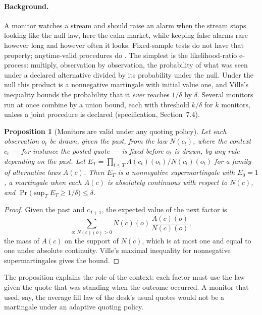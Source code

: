 \documentclass[11pt]{article}
\newcommand{\spec}[1]{specification, Section~#1}
\theoremstyle{definition}
\theoremstyle{plain}
\newtheorem{proposition}[definition]{Proposition}
\begin{document}
\paragraph{Background.} A monitor watches a stream and should raise an alarm when the stream stops
looking like the null law, here the calm market, while keeping false alarms rare however long and
however often it looks. Fixed-sample tests do not have that property; anytime-valid procedures do
\cite{ramdas,howardcs}. The simplest is the likelihood-ratio e-process: multiply, observation by
observation, the probability of what was seen under a declared alternative divided by its probability
under the null. Under the null this product is a nonnegative martingale with initial value one, and
Ville's inequality \cite{ville} bounds the probability that it \emph{ever} reaches $1/\delta$ by
$\delta$. Several monitors run at once combine by a union bound, each with threshold $k/\delta$ for $k$
monitors, unless a joint procedure is declared (\spec{7.4}).

\begin{proposition}[Monitors are valid under any quoting policy]\label{prop:monitor}
Let each observation $o_t$ be drawn, given the past, from the law $N(c_t)$, where the context $c_t$ ---
for instance the posted quote --- is fixed before $o_t$ is drawn, by any rule depending on the past. Let
$E_T=\prod_{t\le T}A(c_t)(o_t)/N(c_t)(o_t)$ for a family of alternative laws $A(c)$. Then $E_T$ is a
nonnegative supermartingale with $E_0=1$, a martingale when each $A(c)$ is absolutely continuous with
respect to $N(c)$, and $\Pr\bigl(\sup_TE_T\ge1/\delta\bigr)\le\delta$.
\end{proposition}

\begin{proof}
Given the past and $c_{T+1}$, the expected value of the next factor is
\[
\sum_{o:\,N(c)(o)>0}N(c)(o)\,\frac{A(c)(o)}{N(c)(o)},
\]
the mass of $A(c)$ on the support of $N(c)$, which is at most one and equal to one under absolute
continuity. Ville's maximal inequality for nonnegative supermartingales gives the bound.
\end{proof}

The proposition explains the role of the context: each factor must use the law given the quote that
was standing when the outcome occurred. A monitor that used, say, the average fill law of the desk's usual
quotes would not be a martingale under an adaptive quoting policy.
\end{document}
